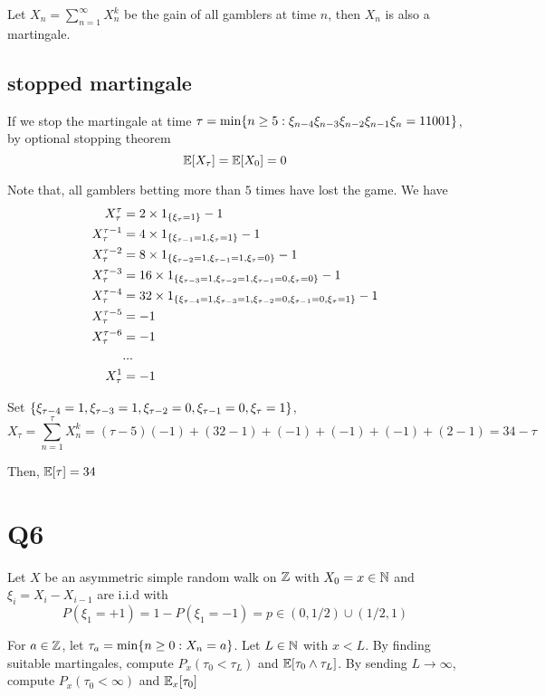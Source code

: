 \documentclass{article}
\begin{document}
Let $X_n = \sum_{n=1}^\infty X^k_n$ be the gain of all gamblers at time $n$, then $X_n$ is also a martingale.

\subsection{stopped martingale}

If we stop the martingale at time $\tau = \min\{n \geq 5: \xi_{n-4} \xi_{n-3} \xi_{n-2} \xi_{n-1} \xi_n = 11001\}$, by optional stopping theorem
$$
	\mathbb{E}[X_\tau] = \mathbb{E}[X_0] = 0
$$

Note that, all gamblers betting more than $5$ times have lost the game. We have
\begin{align*}
	X_\tau^\tau &= 2 \times 1_{\{\xi_\tau = 1\}} - 1\\
	X_\tau^{\tau - 1} &= 4 \times 1_{\{\xi_{\tau-1} = 1, \xi_\tau = 1\}} - 1\\
	X_\tau^{\tau - 2} &= 8 \times 1_{\{\xi_{\tau-2} = 1, \xi_{\tau-1} = 1, \xi_\tau = 0\}} -1 \\
	X_\tau^{\tau - 3} &= 16 \times 1_{\{\xi_{\tau-3} = 1, \xi_{\tau-2} = 1, \xi_{\tau-1} = 0, \xi_\tau = 0\}} -1 \\
	X_\tau^{\tau - 4} &= 32 \times 1_{\{\xi_{\tau - 4} = 1, \xi_{\tau-3} = 1, \xi_{\tau-2} = 0, \xi_{\tau-1} = 0, \xi_\tau = 1\}} - 1\\
	X_\tau^{\tau - 5} &= -1 \\
	X_\tau^{\tau - 6} &= -1 \\
	&... \\
	X_\tau^1 &= -1
\end{align*}

Set $\{\xi_{\tau - 4} = 1, \xi_{\tau-3} = 1, \xi_{\tau-2} = 0, \xi_{\tau-1} = 0, \xi_\tau = 1\}$, 
$$
	X_\tau = \sum_{n=1}^\tau X^k_n= (\tau - 5)(-1) + (32-1) + (-1) + (-1) + (-1) + (2-1) = 34 - \tau
$$

Then, $\mathbb{E}[\tau] = 34$

\section{Q6}

Let $X$ be an asymmetric simple random walk on $\mathbb{Z}$ with $X_0 = x \in \mathbb{N}$ and $\xi_i = X_i - X_{i-1}$ are i.i.d with
$$
	P(\xi_1 = +1) = 1 - P(\xi_1 = -1) = p \in (0, 1/2) \cup (1/2, 1)
$$

For $a \in \mathbb{Z}$, let $\tau_a = \min\{n \geq 0: X_n = a\}$. Let $L \in \mathbb{N}$ with $x < L$. By finding suitable martingales, compute $P_x(\tau_0 < \tau_L)$ and $\mathbb{E}[\tau_0 \wedge \tau_L]$. By sending $L \to \infty$, compute $P_x(\tau_0 < \infty)$ and $\mathbb{E}_x[\tau_0]$
\end{document}
